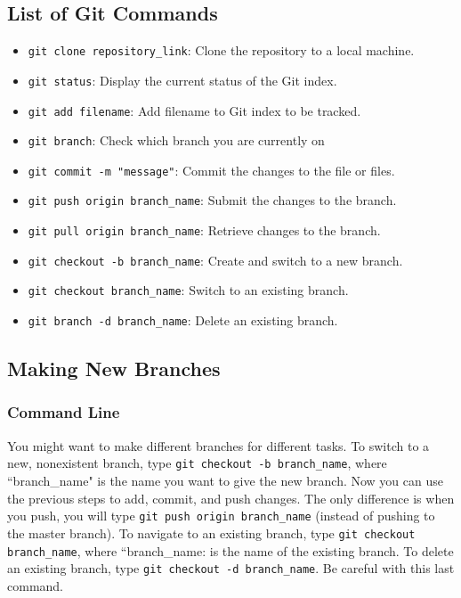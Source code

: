\documentclass[11pt,a4paper]{article}
\begin{document}
\subsection{List of Git Commands} \label{git-commands}

\begin{itemize}
\item \texttt{git clone repository\_link}: Clone the repository to a local machine.
\item \texttt{git status}: Display the current status of the Git index.
\item \texttt{git add filename}: Add filename to Git index to be tracked.
\item \texttt{git branch}: Check which branch you are currently on
\item \texttt{git commit -m "message"}: Commit the changes to the file or files. 
\item \texttt{git push origin branch\_name}: Submit the changes to the branch.
\item \texttt{git pull origin branch\_name}: Retrieve changes to the branch.
\item \texttt{git checkout -b branch\_name}: Create and switch to a new branch.
\item \texttt{git checkout branch\_name}: Switch to an existing branch.
\item \texttt{git branch -d branch\_name}: Delete an existing branch.
\end{itemize}

\subsection{Making New Branches}

\subsubsection{Command Line}
You might want to make different branches for different tasks.
To switch to a new, nonexistent branch, type \texttt{git checkout -b branch\_name}, where ``branch\_name" is the name you want to give the new branch.
Now you can use the previous steps to add, commit, and push changes.
The only difference is when you push, you will type \texttt{git push origin branch\_name} (instead of pushing to the master branch).
To navigate to an existing branch, type \texttt{git checkout branch\_name}, where ``branch\_name: is the name of the existing branch.
To delete an existing branch, type \texttt{git checkout -d branch\_name}.
Be careful with this last command.
\end{document}
